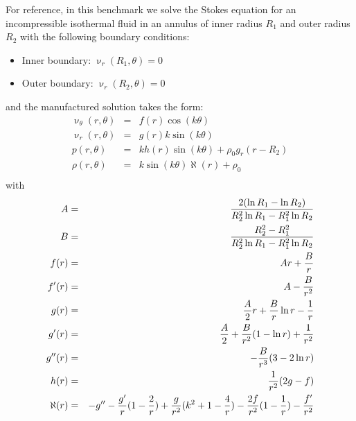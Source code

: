 For reference, in this benchmark we solve the Stokes equation for an incompressible
isothermal fluid in an annulus of inner radius $R_1$
and outer radius $R_2$ with the following boundary conditions:
\begin{itemize}
\item Inner boundary: $\upnu_r(R_1,\theta)=0$ 
\item Outer boundary: $\upnu_r(R_2,\theta)=0$ 
\end{itemize}
and the manufactured solution takes the form:
\begin{eqnarray}
\upnu_\theta(r,\theta) &=& f(r) \cos(k\theta) \\
\upnu_r(r,\theta) &=& g(r) k  \sin(k\theta)  \\
p(r,\theta) &=& k h(r) \sin(k \theta) + \rho_0 g_r (r-R_2)  \\
\rho(r,\theta) &=& k \sin (k \theta) \aleph(r) + \rho_0 \\
\end{eqnarray}
with
\begin{eqnarray}
A &=& \frac{2(\ln R_1 - \ln R_2)} { R_2^2 \ln R_1  - R_1^2 \ln R_2}    \nonumber\\
B &=& \frac{R_2^2-R_1^2}{R_2^2 \ln R_1 - R_1^2 \ln R_2} \nonumber\\
f(r)   &=& Ar +\frac{B}{r} \nonumber\\
f'(r)  &=& A - \frac{B}{r^2} \nonumber\\
g(r)   &=& \frac{A}{2}r  +  \frac{B}{r} \ln r - \frac{1}{r} \nonumber\\
g'(r)  &=& \frac{A}{2}  +  \frac{B}{r^2} (1-\ln r)   + \frac{1}{r^2} \nonumber\\
g''(r) &=&  - \frac{B}{r^3} (3 - 2 \ln r )  \nonumber\\
h(r)   &=& \frac{1}{r^2}(2g-f) \nonumber\\
\aleph(r) &=&  -g'' - \frac{g'}{r} ( 1 - \frac{2}{r}) + \frac{g}{r^2} (k^2 + 1 -\frac{4}{r})  
- \frac{2f}{r^2}  (1-\frac{1}{r}) - \frac{f'}{r^2}   \nonumber
\end{eqnarray}

